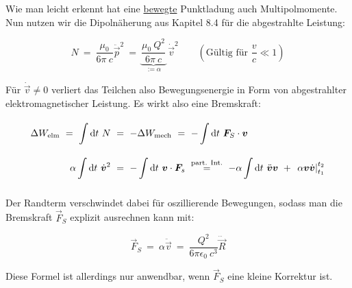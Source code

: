 Wie man leicht erkennt hat eine \underline{bewegte} Punktladung auch Multipolmomente. Nun nutzen wir die Dipolnäherung aus Kapitel 8.4 für die abgestrahlte Leistung:

\begin{equation*}
N  \ = \  \frac{\mu_0}{6\pi \ c} \ddot{\vec{p}}^2  \ = \  \underbrace{\frac{\mu_0 \ Q^2}{6\pi \ c}}_{:=\alpha} \ \dot{\vec{v}}^2 \qquad \left(\text{Gültig für } \frac{v}{c}\ll 1\right)
\end{equation*}

Für $\dot{\vec{v}}\neq 0$ verliert das Teilchen also Bewegungsenergie in Form von abgestrahlter elektromagnetischer Leistung. Es wirkt also eine Bremskraft:

\begin{align*}
\Delta W_{\text{elm}}  \ = \ \Int{}{}{t} N  \ &= \ - \Delta W_{\text{mech}}  \ = \  - \Int{}{}{t} \vec{F}_S\cdot\vec{v}\\
\alpha \Int{}{}{t}\dot{\vec{v}}^2  \ &= \ - \Int{}{}{t}\vec{v}\cdot\vec{F}_s \ \overset{\text{part. Int.}}{=} \ - \alpha\Int{}{}{t}\ddot{\vec{v}}\vec{v} \ + \ \left.\alpha\vec{v}\dot{\vec{v}}\right|^{t_2}_{t_1} 
\end{align*}

Der Randterm verschwindet dabei für oszillierende Bewegungen, sodass man die Bremskraft $\vec{F}_S$ explizit ausrechnen kann mit:

\begin{equation*}
\vec{F}_S \ = \ \alpha \ddot{\vec{v}}  \ = \ \frac{Q^2}{6\pi\epsilon_0 \ c^3} \dddot{\vec{R}}
\end{equation*}

Diese Formel ist allerdings nur anwendbar, wenn $\vec{F}_S$ eine kleine Korrektur ist.